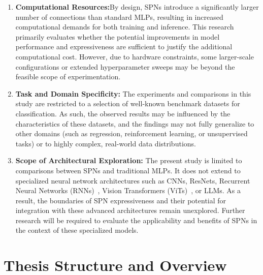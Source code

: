 \begin{enumerate}
\item \textbf{Computational Resources:}By design, SPNs introduce a significantly larger number of connections than standard MLPs, resulting in increased computational demands for both training and inference. This research primarily evaluates whether the potential improvements in model performance and expressiveness are sufficient to justify the additional computational cost. However, due to hardware constraints, some larger-scale configurations or extended hyperparameter sweeps may be beyond the feasible scope of experimentation.
\item \textbf{Task and Domain Specificity:} The experiments and comparisons in this study are restricted to a selection of well-known benchmark datasets for classification. As such, the observed results may be influenced by the characteristics of these datasets, and the findings may not fully generalize to other domains (such as regression, reinforcement learning, or unsupervised tasks) or to highly complex, real-world data distributions.
\item \textbf{Scope of Architectural Exploration:} The present study is limited to comparisons between SPNs and traditional MLPs. It does not extend to specialized neural network architectures such as CNNs, ResNets, Recurrent Neural Networks (RNNs)~\cite{lipton2015critical}, Vision Transformers (ViTs)~\cite{dosovitskiy2020image}, or LLMs. As a result, the boundaries of SPN expressiveness and their potential for integration with these advanced architectures remain unexplored. Further research will be required to evaluate the applicability and benefits of SPNs in the context of these specialized models.
\end{enumerate}



\section{Thesis Structure and Overview}

